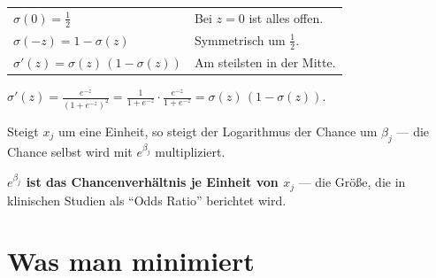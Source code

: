 \begin{merksatz}
\begin{center}
\end{center}

\begin{center}
{\small
\renewcommand{\arraystretch}{1.5}
\begin{tabular}{@{}P{3.2cm}P{5.4cm}@{}}
\toprule
$\sigma(0) = \tfrac12$ & Bei $z = 0$ ist alles offen.\\
$\sigma(-z) = 1-\sigma(z)$ & Symmetrisch um $\tfrac12$.\\
$\sigma'(z) = \sigma(z)\,(1-\sigma(z))$ & Am steilsten in der Mitte.\\
\bottomrule
\end{tabular}}
\end{center}

 $\sigma'(z) = \frac{e^{-z}}{(1+e^{-z})^{2}} = \frac{1}{1+e^{-z}}\cdot\frac{e^{-z}}{1+e^{-z}} = \sigma(z)\,(1-\sigma(z))$.

Steigt $x_j$ um eine Einheit, so steigt der Logarithmus der Chance um $\beta_j$ --- die Chance selbst wird mit $e^{\beta_j}$ multipliziert.

\begin{center}
\begin{minipage}{0.9\textwidth}
\textbf{$e^{\beta_j}$ ist das Chancenverhältnis je Einheit von $x_j$} --- die Größe, die in klinischen Studien als \enquote{Odds Ratio} berichtet wird.
\end{minipage}
\end{center}
\end{merksatz}

\section{Was man minimiert}

